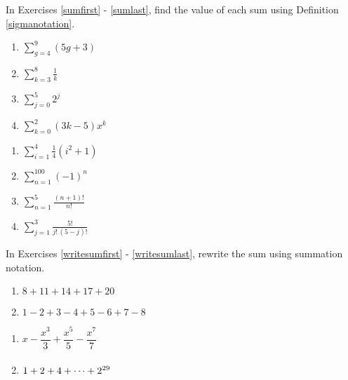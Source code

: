 \documentclass{ximera}
\begin{document}
	\author{Stitz-Zeager}


In Exercises \ref{sumfirst} - \ref{sumlast}, find the value of each sum using Definition \ref{sigmanotation}.

\begin{multicols}{4} 
\begin{enumerate}

\item $\displaystyle \sum_{g = 4}^{9} (5g + 3)$  \label{sumfirst}
\item $\displaystyle \sum_{k = 3}^{8} \frac{1}{k}$
\item $\displaystyle \sum_{j = 0}^{5} 2^{j}$
\item $\displaystyle \sum_{k = 0}^{2} (3k - 5)x^{k}$

\setcounter{HW}{\value{enumi}}
\end{enumerate}
\end{multicols}

\begin{multicols}{4}
\begin{enumerate}
\setcounter{enumi}{\value{HW}}

\item $\displaystyle \sum_{i = 1}^{4} \frac{1}{4}(i^{2} + 1)$
\item $\displaystyle \sum_{n = 1}^{100} (-1)^{n}$
\item $\displaystyle \sum_{n = 1}^{5} \frac{(n+1)!}{n!}$
\item $\displaystyle \sum_{j = 1}^{3} \frac{5!}{j! \, (5-j)!}$  \label{sumlast}

\setcounter{HW}{\value{enumi}}
\end{enumerate}
\end{multicols}

In Exercises \ref{writesumfirst} - \ref{writesumlast},  rewrite the sum using summation notation.


\begin{multicols}{2}
\begin{enumerate}
\setcounter{enumi}{\value{HW}}

\item $8 + 11 + 14 + 17 + 20$  \label{writesumfirst}
\item $1 - 2 + 3 - 4 + 5 - 6 + 7 - 8$

\setcounter{HW}{\value{enumi}}
\end{enumerate}
\end{multicols}

\begin{multicols}{2}
\begin{enumerate}
\setcounter{enumi}{\value{HW}}

\item $x - \dfrac{x^{3}}{3} + \dfrac{x^{5}}{5} - \dfrac{x^{7}}{7}$
\item $1 + 2 + 4 + \cdots + 2^{29} \vphantom{x - \dfrac{x^{3}}{3} + \dfrac{x^{5}}{5} - \dfrac{x^{7}}{7}}$

\setcounter{HW}{\value{enumi}}
\end{enumerate}
\end{multicols}
\end{document}
